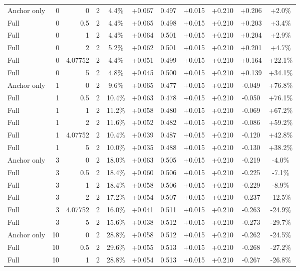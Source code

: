 \begin{table}[htbp]
\begin{tabular}{lrrrccccccc}
Anchor only & 0 & 0 & 2 & 4.4\% & +0.067 & 0.497 & +0.015 & +0.210 & +0.206 & +2.0\% \\
Full & 0 & 0.5 & 2 & 4.4\% & +0.065 & 0.498 & +0.015 & +0.210 & +0.203 & +3.4\% \\
Full & 0 & 1 & 2 & 4.4\% & +0.064 & 0.501 & +0.015 & +0.210 & +0.204 & +2.9\% \\
Full & 0 & 2 & 2 & 5.2\% & +0.062 & 0.501 & +0.015 & +0.210 & +0.201 & +4.7\% \\
Full & 0 & 4.07752 & 2 & 4.4\% & +0.051 & 0.499 & +0.015 & +0.210 & +0.164 & +22.1\% \\
Full & 0 & 5 & 2 & 4.8\% & +0.045 & 0.500 & +0.015 & +0.210 & +0.139 & +34.1\% \\
Anchor only & 1 & 0 & 2 & 9.6\% & +0.065 & 0.477 & +0.015 & +0.210 & -0.049 & +76.8\% \\
Full & 1 & 0.5 & 2 & 10.4\% & +0.063 & 0.478 & +0.015 & +0.210 & -0.050 & +76.1\% \\
Full & 1 & 1 & 2 & 11.2\% & +0.058 & 0.480 & +0.015 & +0.210 & -0.069 & +67.2\% \\
Full & 1 & 2 & 2 & 11.6\% & +0.052 & 0.482 & +0.015 & +0.210 & -0.086 & +59.2\% \\
Full & 1 & 4.07752 & 2 & 10.4\% & +0.039 & 0.487 & +0.015 & +0.210 & -0.120 & +42.8\% \\
Full & 1 & 5 & 2 & 10.0\% & +0.035 & 0.488 & +0.015 & +0.210 & -0.130 & +38.2\% \\
Anchor only & 3 & 0 & 2 & 18.0\% & +0.063 & 0.505 & +0.015 & +0.210 & -0.219 & -4.0\% \\
Full & 3 & 0.5 & 2 & 18.4\% & +0.060 & 0.506 & +0.015 & +0.210 & -0.225 & -7.1\% \\
Full & 3 & 1 & 2 & 18.4\% & +0.058 & 0.506 & +0.015 & +0.210 & -0.229 & -8.9\% \\
Full & 3 & 2 & 2 & 17.2\% & +0.054 & 0.507 & +0.015 & +0.210 & -0.237 & -12.5\% \\
Full & 3 & 4.07752 & 2 & 16.0\% & +0.041 & 0.511 & +0.015 & +0.210 & -0.263 & -24.9\% \\
Full & 3 & 5 & 2 & 15.6\% & +0.038 & 0.512 & +0.015 & +0.210 & -0.273 & -29.7\% \\
Anchor only & 10 & 0 & 2 & 28.8\% & +0.058 & 0.512 & +0.015 & +0.210 & -0.262 & -24.5\% \\
Full & 10 & 0.5 & 2 & 29.6\% & +0.055 & 0.513 & +0.015 & +0.210 & -0.268 & -27.2\% \\
Full & 10 & 1 & 2 & 28.8\% & +0.054 & 0.513 & +0.015 & +0.210 & -0.267 & -26.8\% \\

\end{tabular}
\end{table}
